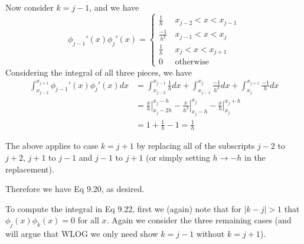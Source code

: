 \documentclass[11pt]{article}
\def\f{\frac }
\begin{document}
\begin{enumerate}
Now consider $k = j-1$, and we have
\begin{equation*} \phi _{j-1} '(x) \phi_j '(x) = \left\{ \begin{array}{cc} \f{1}{h} & x_{j-2} < x < x_{j-1} \\ \f{-1}{h^2} & x_{j-1} < x < x_{j} \\ \f{1}{h} & x_{j} < x < x_{j+1} \\0~~~ & \text{otherwise}\end{array} \right. \end{equation*}
Considering the integral of all three pieces, we have
\begin{align*} \int _{x_{j-2}} ^{x_{j+1}} \phi _{j-1} '(x) \phi_j '(x) dx &= \int _{x_{j-2}} ^{x_{j-1}} \f{1}{h} dx + \int _{x_{j-1}} ^{x_{j}} \f{-1}{h^2} dx + \int _{x_{j}} ^{x_{j+1}} \f{-1}{h} dx \\
&= \left. \f{x}{h} \right | _{x_{j}-2h} ^{x_{j}-h} - \left. \f{x}{h^2} \right| _{x_{j}-h} ^{x_{j}} - \left. \f{x}{h} \right | _{x_{j}} ^{x_{j}+h} \\
&= 1 +\f{1}{h} - 1 = \f{1}{h} \end{align*}

The above applies to case $k=j+1$ by replacing all of the subscripts $j-2$ to $j+2$, $j+1$ to $j-1$ and $j-1$ to $j+1$ (or simply setting $h \to -h$ in the replacement).

Therefore we have Eq 9.20, as desired.

To compute the integral in Eq 9.22, first we (again) note that for $|k-j| >1 $ that $\phi_j(x) \phi _k(x) = 0$ for all $x$.
Again we consider the three remaining cases (and will argue that WLOG we only need show $k=j-1$ without $k=j+1$).


\end{enumerate}
\end{document}
